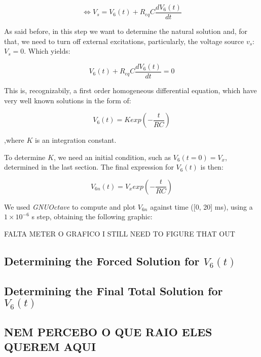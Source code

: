 \begin{center}
  \begin{equation}
    \Leftrightarrow V_s = V_6(t) + R_{eq}C\frac{dV_6(t)}{dt}
  \end{equation} 
\end{center}


As said before, in this step we want to determine the natural solution and, for that, we need to turn off external excitations, particularly, the voltage source $v_s$: $V_s = 0$. Which yields:

\begin{center}
  \begin{equation}
    V_6(t) + R_{eq}C\frac{dV_6(t)}{dt} = 0
  \end{equation} 
\end{center}



This is, recognizabily, a first order homogeneous differential equation, which have very well known solutions in the form of:

\begin{center}
  \begin{equation}
    V_6(t) = K exp(-\frac{t}{RC})
  \end{equation} 
\end{center}


,where $K$ is an integration constant.

To determine $K$, we need an initial condition, such as $V_6(t=0) = V_x$, determined in the last section. The final expression for $V_6(t)$ is then:

\begin{center}
  \begin{equation}
    V_{6n}(t) = V_x exp(-\frac{t}{RC})
  \end{equation} 
\end{center}



We used \textit{GNUOctave} to compute and plot $V_{6n}$ against time ([0, 20] ms), using a $1\times10^{-6}$ s step, obtaining the following graphic:


FALTA METER O GRAFICO I STILL NEED TO FIGURE THAT OUT


\subsection{Determining the Forced Solution for $V_6(t)$}

\subsection{Determining the Final Total Solution for $V_6(t)$}


\subsection{NEM PERCEBO O QUE RAIO ELES QUEREM AQUI}


